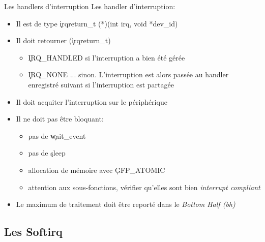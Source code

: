 \begin{frame}[fragile=singleslide]{Les handlers d'interruption}
  Les handler d'interruption:
  \begin{itemize} 
  \item Il est de type \c{irqreturn_t (*)(int irq, void *dev_id)}
  \item Il doit retourner (\c{irqreturn_t})
    \begin{itemize} 
    \item  \c{IRQ_HANDLED} si l'interruption a bien été gérée
    \item \c{IRQ_NONE}  ... sinon. L'interruption est  alors passée au
      handler enregistré suivant si l'interruption est partagée
    \end{itemize} 
  \item Il doit acquiter l'interruption sur le périphérique
  \item Il ne doit pas être bloquant: 
    \begin{itemize} 
    \item pas de \c{wait_event}
    \item pas de \c{sleep}
    \item allocation de mémoire avec \c{GFP_ATOMIC}
    \item  attention aux sous-fonctions,  vérifier qu'elles  sont bien
      \emph{interrupt compliant}
    \end{itemize}
  \item  Le   maximum  de  traitement   doit  être  reporté   dans  le
    \emph{Bottom Half (bh)}
  \end{itemize}  
\end{frame} 

\subsection{Les Softirq}

